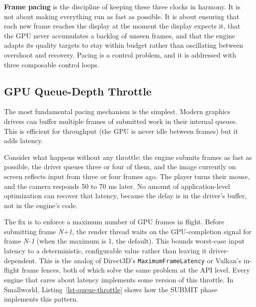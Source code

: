 \documentclass[
  11pt,
  letterpaper,
  DIV=11,
  numbers=noendperiod,
  twoside,
  open=right]{scrreprt}
\begin{document}
\textbf{Frame pacing} is the discipline of keeping these three clocks in
harmony. It is not about making everything run as fast as possible. It
is about ensuring that each new frame reaches the display at the moment
the display expects it, that the GPU never accumulates a backlog of
unseen frames, and that the engine adapts its quality targets to stay
within budget rather than oscillating between overshoot and recovery.
Pacing is a control problem, and it is addressed with three composable
control loops.

\subsection{GPU Queue-Depth Throttle}\label{gpu-queue-depth-throttle}

The most fundamental pacing mechanism is the simplest. Modern graphics
drivers can buffer multiple frames of submitted work in their internal
queues. This is efficient for throughput (the GPU is never idle between
frames) but it adds latency.

Consider what happens without any throttle: the engine submits frames as
fast as possible, the driver queues three or four of them, and the image
currently on screen reflects input from three or four frames ago. The
player turns their mouse, and the camera responds 50 to 70 ms later. No
amount of application-level optimization can recover that latency,
because the delay is in the driver's buffer, not in the engine's code.

The fix is to enforce a maximum number of GPU frames in flight. Before
submitting frame \emph{N+1}, the render thread waits on the
GPU-completion signal for frame \emph{N-1} (when the maximum is 1, the
default). This bounds worst-case input latency to a deterministic,
configurable value rather than leaving it driver-dependent. This is the
analog of Direct3D's \texttt{MaximumFrameLatency} or Vulkan's in-flight
frame fences, both of which solve the same problem at the API level.
Every engine that cares about latency implements some version of this
throttle. In Smallworld, Listing~\ref{lst-queue-throttle} shows how the
SUBMIT phase implements this pattern.
\end{document}
